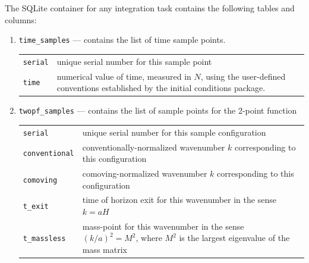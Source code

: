 \documentclass[11pt,a4paper]{article}
\newcommand{\packagefont}{\sffamily}
\newcommand{\SQLite}{{\packagefont SQLite}}
\newenvironment{sqltablelist}{\renewcommand{\arraystretch}{1.3}\small}{}
\begin{document}
The {\SQLite} container for any integration task contains the following tables
and columns:
\begin{sqltablelist}    
\begin{enumerate}
    \item \texttt{time_samples} --- contains the list of time sample points. \\
    \label{sqltable:time-samples}
    \begin{tabular}{p{2.5cm}p{11.2cm}}
        \texttt{serial} & unique serial number for this sample point \\
        \texttt{time} & numerical value of time, measured in $N$, using
        the user-defined conventions established by the
        initial conditions package.
    \end{tabular}
    
    \item \texttt{twopf_samples} --- contains the list of sample points for the 2-point function \\
    \label{sqltable:twopf-samples}
    \begin{tabular}{p{2.5cm}p{11.2cm}}
        \texttt{serial} & unique serial number for this sample configuration \\
        \texttt{conventional} & conventionally-normalized wavenumber $k$
        corresponding to this configuration \\
        \texttt{comoving} & comoving-normalized wavenumber $k$
        corresponding to this configuration \\
        \texttt{t_exit} & time of horizon exit for this wavenumber in the sense $k=aH$ \\
        \texttt{t_massless} & mass-point for this wavenumber in the
        sense $(k/a)^2 = M^2$, where $M^2$ is the largest eigenvalue of the mass
        matrix
    \end{tabular}


\end{enumerate}
\end{sqltablelist}
\end{document}
